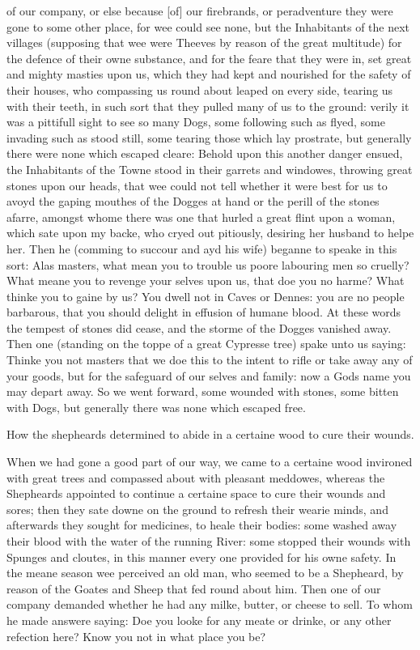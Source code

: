 of our company, or else because [of] our firebrands, or peradventure they were
gone to some other place, for wee could see none, but the Inhabitants of the
next villages (supposing that wee were Theeves by reason of the great
multitude) for the defence of their owne substance, and for the feare that they
were in, set great and mighty masties upon us, which they had kept and
nourished for the safety of their houses, who compassing us round about leaped
on every side, tearing us with their teeth, in such sort that they pulled many
of us to the ground: verily it was a pittifull sight to see so many Dogs, some
following such as flyed, some invading such as stood still, some tearing those
which lay prostrate, but generally there were none which escaped cleare: Behold
upon this another danger ensued, the Inhabitants of the Towne stood in their
garrets and windowes, throwing great stones upon our heads, that wee could not
tell whether it were best for us to avoyd the gaping mouthes of the Dogges at
hand or the perill of the stones afarre, amongst whome there was one that
hurled a great flint upon a woman, which sate upon my backe, who cryed out
pitiously, desiring her husband to helpe her. Then he (comming to succour and
ayd his wife) beganne to speake in this sort: Alas masters, what mean you to
trouble us poore labouring men so cruelly? What meane you to revenge your
selves upon us, that doe you no harme? What thinke you to gaine by us? You
dwell not in Caves or Dennes: you are no people barbarous, that you should
delight in effusion of humane blood. At these words the tempest of stones did
cease, and the storme of the Dogges vanished away. Then one (standing on the
toppe of a great Cypresse tree) spake unto us saying: Thinke you not masters
that we doe this to the intent to rifle or take away any of your goods, but for
the safeguard of our selves and family: now a Gods name you may depart away. So
we went forward, some wounded with stones, some bitten with Dogs, but generally
there was none which escaped free.


How the shepheards determined to abide in a certaine wood to cure their wounds.

When we had gone a good part of our way, we came to a certaine wood invironed
with great trees and compassed about with pleasant meddowes, whereas the
Shepheards appointed to continue a certaine space to cure their wounds and
sores; then they sate downe on the ground to refresh their wearie minds, and
afterwards they sought for medicines, to heale their bodies: some washed away
their blood with the water of the running River: some stopped their wounds with
Spunges and cloutes, in this manner every one provided for his owne safety. In
the meane season wee perceived an old man, who seemed to be a Shepheard, by
reason of the Goates and Sheep that fed round about him. Then one of our
company demanded whether he had any milke, butter, or cheese to sell. To whom
he made answere saying: Doe you looke for any meate or drinke, or any other
refection here? Know you not in what place you be?

